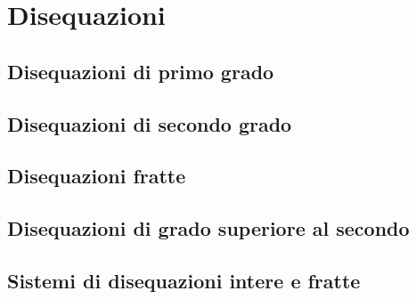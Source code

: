 \chapter{Disequazioni}
\section{Disequazioni di primo grado}
\section{Disequazioni di secondo grado}
\section{Disequazioni fratte}
\section{Disequazioni di grado superiore al secondo}
\section{Sistemi di disequazioni intere e fratte}